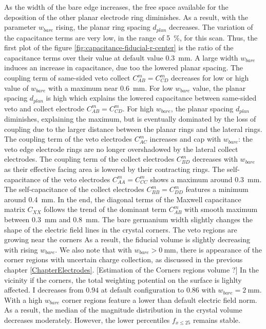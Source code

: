 As the width of the bare edge increases, the free space available for the deposition of the other planar electrode ring diminishes. As a result, with the parameter $w_{bare}$ rising, the planar ring spacing $d_{plan}$ decreases.  
The variation of the capacitance terms are very low, in the range of \SI{5}{\percent}, for this scan. Thus, the first plot of the figure \ref{fig:capacitance-fiducial-r-center} is the ratio of the capacitance terms over their value at default value \SI{0.3}{\mm}. A large width $w_{bare}$ induces an increase in capacitance, due too the lowered planar spacing.
The coupling term of same-sided veto collect $C_{AB}^m=C_{CD}^m$ decreases for low or high value of $w_{bare}$ with a maximum near \SI{0.6}{\mm}. For low $w_{bare}$ value, the planar spacing $d_{plan}$ is high which explains the lowered capacitance between same-sided veto and collect electrode $C_{AB}^m=C_{CD}^m$. For high $w_{bare}$, the planar spacing $d_{plan}$ diminishes, explaining the maximum, but is eventually dominated by the loss of coupling due to the larger distance between the planar rings and the lateral rings. The coupling term of the veto electrodes $C_{AC}^m$ increases and cap with $w_{bare}$: the veto edge electrode rings are no longer overshadowed by the lateral collect electrodes. The coupling term of the collect electrodes $C_{BD}^m$ decreases with $w_{bare}$ as their effective facing area is lowered by their contracting rings. The self-capacitance of the veto electrodes $C_{AA}^m = C_{CC}^m$ shows a maximum around \SI{0.3}{\mm}. The self-capacitance of the collect electrodes $C_{BB}^m = C_{DD}^m$ features a minimum around \SI{0.4}{\mm}. In the end, the diagonal terms of the Maxwell capacitance matrix $C_{XX}$ follows the trend of the dominant term $C_{AB}^m$ with smooth maximum between 
\SI{0.3}{\mm} and \SI{0.8}{\mm}.
The bare germanium width slightly changes the shape of the electric field lines in the crystal corners. The veto regions are growing near the corners As a result, the fiducial volume is slightly decreasing with rising $w_{bare}$. We also note that with $w_{bare} > \SI{0}{\mm}$, there is appearance of the corner regions with uncertain charge collection, as discussed in the previous chapter \ref{ChapterElectrodes}. {\color{red} [Estimation of the Corners regions volume ?]}
In the vicinity if the corners, the total weighting potential on the surface is lighlty affected. I decreases from $0.94$ at default configuration to $0.86$ with $w_{bare} = \SI{2}{\mm}$.
With a high $w_{bare}$ corner regions feature a lower than default electric field norm. As a result, the median of the magnitude distribution in the crystal volume decreases moderately. However, the lower percentiles $f_{x \leq 25}$ remains stable.

